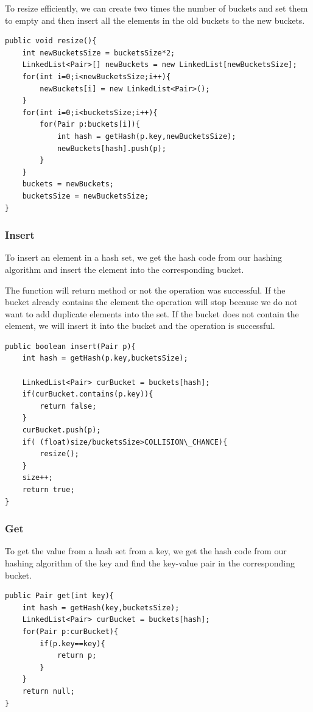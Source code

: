 \documentclass[11pt,oneside]{book}
\begin{document}
To resize efficiently, we can create two times the number of buckets and set them to empty and then insert all the elements in the old buckets to the new buckets.

\begin{lstlisting}
public void resize(){
    int newBucketsSize = bucketsSize*2;
    LinkedList<Pair>[] newBuckets = new LinkedList[newBucketsSize];
    for(int i=0;i<newBucketsSize;i++){
        newBuckets[i] = new LinkedList<Pair>();
    }
    for(int i=0;i<bucketsSize;i++){
        for(Pair p:buckets[i]){
            int hash = getHash(p.key,newBucketsSize);
            newBuckets[hash].push(p);
        }
    }
    buckets = newBuckets;
    bucketsSize = newBucketsSize;
}
\end{lstlisting}

\subsubsection{Insert}

To insert an element in a hash set, we get the hash code from our hashing algorithm and insert the element into the corresponding bucket.

The function will return method or not the operation was successful. If the bucket already contains the element the operation will stop because we do not want to add duplicate elements into the set. If the bucket does not contain the element, we will insert it into the bucket and the operation is successful.

\begin{lstlisting}
public boolean insert(Pair p){
    int hash = getHash(p.key,bucketsSize);
    
    LinkedList<Pair> curBucket = buckets[hash];
    if(curBucket.contains(p.key)){
        return false;
    }
    curBucket.push(p);
    if( (float)size/bucketsSize>COLLISION\_CHANCE){
        resize();
    }
    size++;
    return true;
}
\end{lstlisting}

\subsubsection{Get}

To get the value from a hash set from a key, we get the hash code from our hashing algorithm of the key and find the key-value pair in the corresponding bucket.

\begin{lstlisting}
public Pair get(int key){
    int hash = getHash(key,bucketsSize);
    LinkedList<Pair> curBucket = buckets[hash];
    for(Pair p:curBucket){
        if(p.key==key){
            return p;
        }
    }
    return null;
}
\end{lstlisting}
\end{document}
